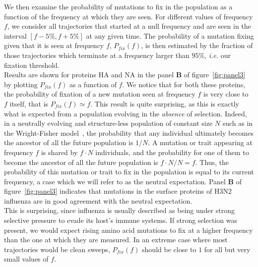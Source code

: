 \documentclass{article}
\begin{document}
	We then examine the probability of mutations to fix in the population as a function of the frequency at which they are seen. For different values of frequency $f$, we consider all trajectories that started at a null frequency and are seen in the interval $[f - 5\%, f + 5\%]$ at any given time. The probability of a mutation fixing given that it is seen at frequency $f$, $P_{fix}(f)$, is then estimated by the fraction of those trajectories which terminate at a frequency larger than $95\%$, \emph{i.e.} our fixation threshold. \\
	Results are shown for proteins HA and NA in the panel \textbf{B} of figure~\ref{fig:panel3} by plotting $P_{fix}(f)$ as a function of $f$. We notice that for both these proteins, the probability of fixation of a new mutation seen at frequency $f$ is very close to $f$ itself, that is $P_{fix}(f)\simeq f$. This result is quite surprising, as this is exactly what is expected from a population evolving in the \emph{absence} of selection. Indeed, in a neutrally evolving and structure-less population of constant size $N$ such as in the Wright-Fisher model~\cite{10.1080/10635150500354860}, the probability that any individual ultimately becomes the ancestor of all the future population is $1/N$. A mutation or trait appearing at frequency $f$ is shared by $f\cdot N$ individuals, and the probability for one of them to become the ancestor of all the future population is $f\cdot N/N=f$. Thus, the probability of this mutation or trait to fix in the population is equal to its current frequency, a case which we will refer to as the neutral expectation. Panel \textbf{B} of figure~\ref{fig:panel3} indicates that mutations in the surface proteins of H3N2 influenza are in good agreement with the neutral expectation.\\
	This is surprising, since influenza is usually described as being under strong selective pressure to evade its host's immune systems. If strong selection was present, we would expect rising amino acid mutations to fix at a higher frequency than the one at which they are measured. In an extreme case where most trajectories would be clean sweeps, $P_{fix}(f)$ should be close to $1$ for all but very small values of $f$. \\
\end{document}
